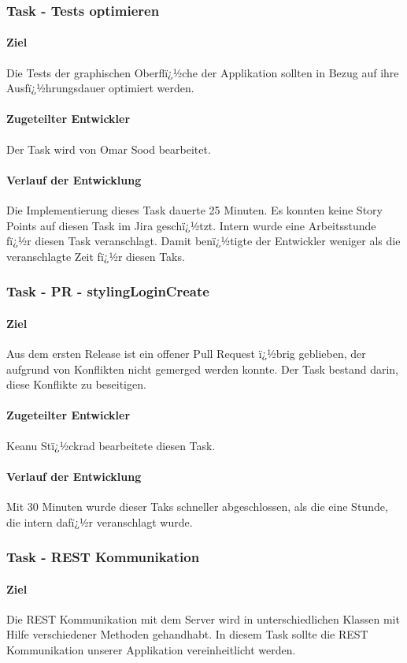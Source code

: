 \documentclass[12pt, titlepage]{scrartcl}
\begin{document}
		\subsubsection{Task - Tests optimieren}
		\paragraph{Ziel} Die Tests der graphischen Oberflï¿½che der Applikation sollten in Bezug auf ihre Ausfï¿½hrungsdauer optimiert werden.
		\paragraph{Zugeteilter Entwickler} Der Task wird von Omar Sood bearbeitet.
		\paragraph{Verlauf der Entwicklung} 
		Die Implementierung dieses Task dauerte 25 Minuten. Es konnten keine Story Points auf diesen Task im Jira geschï¿½tzt. Intern wurde eine Arbeitsstunde fï¿½r diesen Task veranschlagt. Damit benï¿½tigte der Entwickler weniger als die veranschlagte Zeit fï¿½r diesen Taks.
		\subsubsection{Task - PR - stylingLoginCreate}
		\paragraph{Ziel} Aus dem ersten Release ist ein offener Pull Request ï¿½brig geblieben, der aufgrund von Konflikten nicht gemerged werden konnte. Der Task bestand darin, diese Konflikte zu beseitigen.
		\paragraph{Zugeteilter Entwickler} Keanu Stï¿½ckrad bearbeitete diesen Task.
		\paragraph{Verlauf der Entwicklung} 
		Mit 30 Minuten wurde dieser Taks schneller abgeschlossen, als die eine Stunde, die intern dafï¿½r veranschlagt wurde.
		\subsubsection{Task - REST Kommunikation}
		\paragraph{Ziel} Die REST Kommunikation mit dem Server wird in unterschiedlichen Klassen mit Hilfe verschiedener Methoden gehandhabt. In diesem Task sollte die REST Kommunikation unserer Applikation vereinheitlicht werden.
\end{document}
